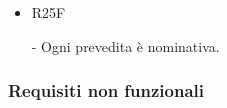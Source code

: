 \documentclass[a4paper]{article}
\begin{document}
\begin{itemize}
	\item \hypertarget{R25F}{R25F} - Ogni prevedita è nominativa.
	
	

	
	
		
	
	
\end{itemize}

\subsubsection{Requisiti non funzionali}
\end{document}
